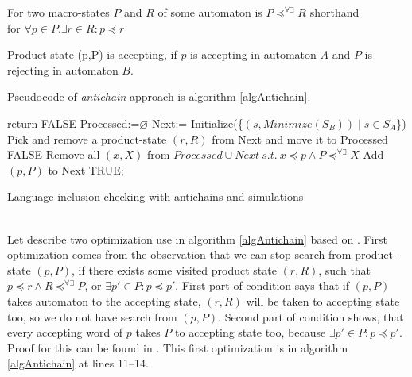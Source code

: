 %
For two macro-states $P$ and $R$ of some automaton is $P\preceq^{\forall\exists}R$ shorthand\\ for $\forall p\in P.\exists r \in R: p \preceq r$

Product state (p,P) is accepting, if $p$ is accepting in automaton $A$ and $P$ is rejecting in automaton $B$.

Pseudocode of \emph{antichain} approach is algorithm \ref{algAntichain}.

\begin{algorithm}[H]
	\label{algAntichain}
			{return FALSE\;}
		Processed:=$\varnothing$\;
		Next:= Initialize(\{$(s,Minimize(S_B))\mid s\in S_A$\})\;
		{
			Pick and remove a product-state $(r,R)$ from Next and move it to Processed\;
			{
				{
					\Return FALSE\;}
					{
						{
							{
							 Remove all $(x,X)$ from $Processed\cup Next\ s.t.\ x\preceq p \wedge P\preceq^{\forall \exists}X$\;
							 Add $(p,P)$ to Next\;
							}
						}
				 }
		  }
		}
		\Return TRUE;
	\caption{Language inclusion checking with antichains and simulations}
\end{algorithm}\
\\
Let describe two optimization use in algorithm \ref{algAntichain} based on \cite{tacas10}. First optimization comes from the observation that
we can stop search from product-state $(p,P)$, if there exists some visited product state $(r,R)$, 
such that $p\preceq r \wedge R\preceq^{\forall\exists}P$, or $\exists p'\in P: p \preceq p'$. First part of condition says that 
if $(p,P)$ takes automaton to the accepting state, $(r,R)$ will be taken to accepting state too, so we do not have search from $(p,P)$. Second part of condition
shows, that every accepting word of $p$ takes $P$ to accepting state too, because $\exists p'\in P: p \preceq p'$.
Proof for this can be found in \cite{tacas10}. This first
optimization is in algorithm \ref{algAntichain} at lines 11--14.

